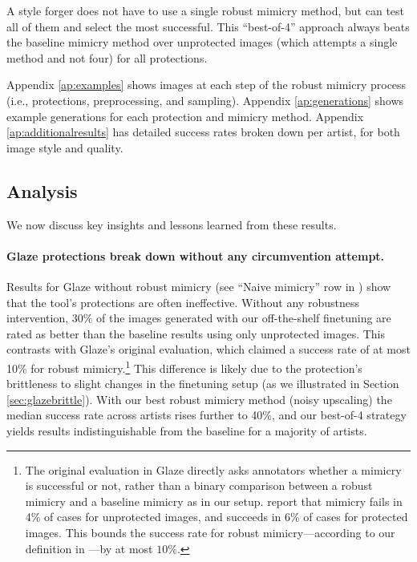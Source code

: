 \documentclass{article}
\begin{document}
A style forger does not have to use a single robust mimicry method, but can test all of them and select the most successful.
This ``best-of-4'' approach always beats the baseline mimicry method over unprotected images (which attempts a single method and not four) for all protections.

Appendix \ref{ap:examples} shows images at each step of the robust mimicry process (i.e., protections, preprocessing, and sampling). Appendix \ref{ap:generations} shows example generations for each protection and mimicry method.
Appendix \ref{ap:additionalresults} has detailed success rates broken down per artist, for both image style and quality. 

\subsection{Analysis}
We now discuss key insights and lessons learned from these results. 


\paragraph{Glaze protections break down without any circumvention attempt.} Results for Glaze without robust mimicry (see ``Naive mimicry'' row in ) show that the tool's protections are often ineffective.
Without any robustness intervention, 30\% of the images generated with our off-the-shelf finetuning are rated as better than the baseline results using only unprotected images.
This contrasts with Glaze's original evaluation, which claimed a success rate of at most 10\% for robust mimicry.\footnote{The original evaluation in Glaze directly asks annotators whether a mimicry is successful or not, rather than a binary comparison between a robust mimicry and a baseline mimicry as in our setup. \citet{glaze} report that mimicry fails in 4\% of cases for unprotected images, and succeeds in 6\% of cases for protected images. This bounds the success rate for robust mimicry---according to our definition in ---by at most $10\%$.} This difference is likely due to the protection's brittleness to slight changes in the finetuning setup (as we illustrated in Section \ref{sec:glazebrittle}).
With our best robust mimicry method (noisy upscaling) the median success rate across artists rises further to 40\%, and our best-of-4 strategy yields results indistinguishable from the baseline for a majority of artists.
\end{document}
